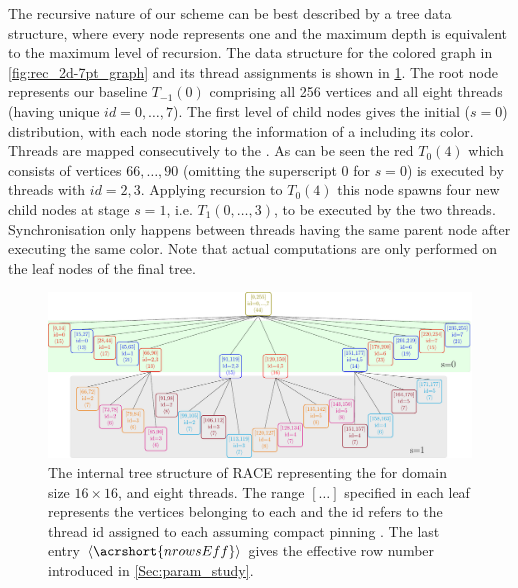 The recursive nature of our scheme can be best  described by a tree data structure, where every node represents one \levelGroup and  the maximum depth is equivalent to the maximum level of recursion. The data structure for the colored graph in \cref{fig:rec_2d-7pt_graph} and its thread assignments is shown in \cref{fig:rec_2d-7pt_tree}. The root node represents our baseline \levelGroup $T_{-1}(0)$ comprising all 256 vertices and all eight threads (having unique $id=0,\ldots,7$). The first level of child nodes gives the initial ($s=0$) distribution, with each node storing the information of a \levelGroup including its color. Threads are mapped consecutively to the \levelGroups. As can be seen the red $T_0(4)$ \levelGroup which consists of vertices $66,\ldots,90$ (omitting the superscript $0$ for $s=0$) is executed by threads with $id=2,3$.  Applying recursion to $T_0(4)$ this node spawns four new child nodes at stage $s =1$, i.e. \levelGroups $T_1(0,\ldots,3)$, to be executed by the two threads. Synchronisation only happens between threads having the same parent node after executing the same color. Note that actual computations are only performed on the leaf nodes of the final tree.
	 \begin{figure}[thbp]
		 \includegraphics[width=\textwidth, height=0.2\textheight]{pics/recursion/2d-7pt_example/tree/tree}
	 	\caption{The internal tree structure of \acrshort{RACE} representing the \stex for domain size $16 \times 16$, and eight threads. The range $[\ldots]$ specified in each leaf represents the vertices belonging to each \levelGroup and the id refers to the thread id assigned to each \levelGroups assuming compact pinning . The last entry $\langle\acrshort{nrowsEff}\rangle$ gives the effective row number introduced in  \cref{Sec:param_study}. }
	 	\label{fig:rec_2d-7pt_tree}
	 \end{figure}

